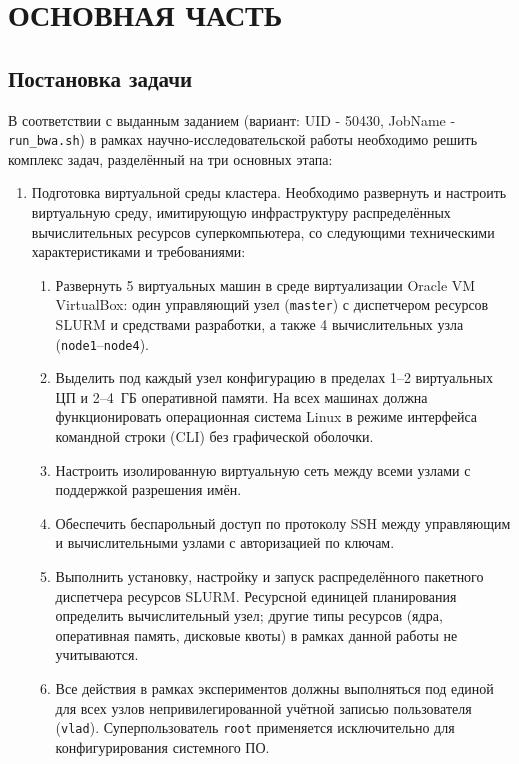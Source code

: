 \newpage
\section{ОСНОВНАЯ ЧАСТЬ}
\subsection{Постановка задачи}

В соответствии с выданным заданием (вариант: UID - 50430, JobName - \texttt{run\_bwa.sh}) в рамках научно-исследовательской работы необходимо решить комплекс задач, разделённый на три основных этапа:

\begin{enumerate}
    \item Подготовка виртуальной среды кластера. Необходимо развернуть и настроить виртуальную среду, имитирующую инфраструктуру распределённых вычислительных ресурсов суперкомпьютера, со следующими техническими характеристиками и требованиями:
    \begin{enumerate}
        \item Развернуть 5 виртуальных машин в среде виртуализации Oracle VM VirtualBox: один управляющий узел (\texttt{master}) с диспетчером ресурсов SLURM и средствами разработки, а также 4 вычислительных узла (\texttt{node1}--\texttt{node4}).
        \item Выделить под каждый узел конфигурацию в пределах 1--2 виртуальных ЦП и 2--4~ГБ оперативной памяти. На всех машинах должна функционировать операционная система Linux в режиме интерфейса командной строки (CLI) без графической оболочки.
        \item Настроить изолированную виртуальную сеть между всеми узлами с поддержкой разрешения имён.
        \item Обеспечить беспарольный доступ по протоколу SSH между управляющим и вычислительными узлами с авторизацией по ключам.
        \item Выполнить установку, настройку и запуск распределённого пакетного диспетчера ресурсов SLURM. Ресурсной единицей планирования определить вычислительный узел; другие типы ресурсов (ядра, оперативная память, дисковые квоты) в рамках данной работы не учитываются.
        \item Все действия в рамках экспериментов должны выполняться под единой для всех узлов непривилегированной учётной записью пользователя (\texttt{vlad}). Суперпользователь \texttt{root} применяется исключительно для конфигурирования системного ПО.
    \end{enumerate}


\end{enumerate}

